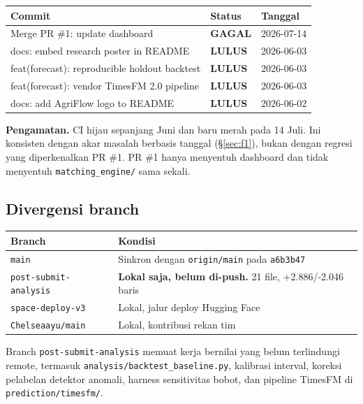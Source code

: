 \documentclass[11pt,a4paper]{article}
\newcommand{\code}[1]{\texttt{\small #1}}
\newcommand{\ok}{\textcolor{okgreen}{\textbf{LULUS}}}
\newcommand{\gagal}{\textcolor{sevhigh}{\textbf{GAGAL}}}
\begin{document}
\begin{center}
\begin{tabular}{@{}p{7.4cm}p{2.4cm}p{4.4cm}@{}}
\toprule
\textbf{Commit} & \textbf{Status} & \textbf{Tanggal} \\
\midrule
Merge PR \#1: update dashboard & \gagal & 2026-07-14 \\
docs: embed research poster in README & \ok & 2026-06-03 \\
feat(forecast): reproducible holdout backtest & \ok & 2026-06-03 \\
feat(forecast): vendor TimesFM 2.0 pipeline & \ok & 2026-06-03 \\
docs: add AgriFlow logo to README & \ok & 2026-06-02 \\
\bottomrule
\end{tabular}
\end{center}

\noindent
\textbf{Pengamatan.} CI hijau sepanjang Juni dan baru merah pada 14 Juli. Ini konsisten dengan
akar masalah berbasis tanggal (\S\ref{sec:f1}), bukan dengan regresi yang diperkenalkan PR \#1.
PR \#1 hanya menyentuh dashboard dan tidak menyentuh \code{matching\_engine/} sama sekali.

\subsection{Divergensi branch}

\begin{center}
\begin{tabular}{@{}p{4.2cm}p{10.8cm}@{}}
\toprule
\textbf{Branch} & \textbf{Kondisi} \\
\midrule
\code{main} & Sinkron dengan \code{origin/main} pada \code{a6b3b47} \\
\code{post-submit-analysis} & \textbf{Lokal saja, belum di-push.} 21 file, +2.886/-2.046 baris \\
\code{space-deploy-v3} & Lokal, jalur deploy Hugging Face \\
\code{Chelseaayu/main} & Lokal, kontribusi rekan tim \\
\bottomrule
\end{tabular}
\end{center}

\noindent
Branch \code{post-submit-analysis} memuat kerja bernilai yang belum terlindungi remote, termasuk
\code{analysis/backtest\_baseline.py}, kalibrasi interval, koreksi pelabelan detektor anomali,
harness sensitivitas bobot, dan pipeline TimesFM di \code{prediction/timesfm/}.
\end{document}
